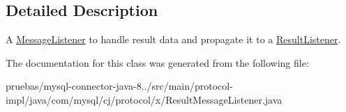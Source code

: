 \subsection{Detailed Description}
A \mbox{\hyperlink{interfacecom_1_1mysql_1_1cj_1_1protocol_1_1_message_listener}{Message\+Listener}} to handle result data and propagate it to a \mbox{\hyperlink{interfacecom_1_1mysql_1_1cj_1_1protocol_1_1_result_listener}{Result\+Listener}}. 

The documentation for this class was generated from the following file\+:\begin{DoxyCompactItemize}
\item 
pruebas/mysql-\/connector-\/java-\/8../src/main/protocol-\/impl/java/com/mysql/cj/protocol/x/Result\+Message\+Listener.\+java\end{DoxyCompactItemize}
